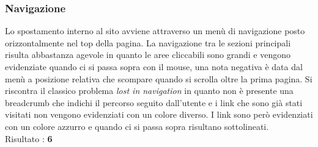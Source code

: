 \subsubsection{Navigazione}
Lo spostamento interno al sito avviene attraverso un menù di navigazione posto
orizzontalmente nel top della pagina. La navigazione tra le sezioni principali
risulta abbastanza agevole in quanto le aree cliccabili sono grandi e vengono 
evidenziate quando ci si passa sopra con il mouse, una nota negativa è data dal 
menù a posizione relativa che scompare quando si scrolla oltre la prima pagina.
Si riscontra il classico problema \textit{lost in navigation} in quanto non è
presente una breadcrumb che indichi il percorso seguito dall'utente e i link che 
sono già stati visitati non vengono evidenziati con un colore diverso. I link 
sono però evidenziati con un colore azzurro e quando ci si passa sopra risultano
sottolineati. \\
Risultato : \textbf{6}